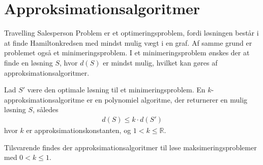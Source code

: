 \section{Approksimationsalgoritmer}
Travelling Salesperson Problem er et optimeringsproblem, fordi løsningen består i at finde Hamiltonkredsen med mindst mulig vægt i en graf. 
Af samme grund er problemet også et minimeringsproblem. 
I et minimeringsproblem ønskes der at finde en løsning $S$, hvor $d(S)$ er mindst mulig, hvilket kan gøres af approksimationsalgoritmer.

\begin{defn}\label{def:apk}
Lad $S'$ være den optimale løsning til et minimeringsproblem. En $k$-approksimationsalgoritme er en polynomiel algoritme, der returnerer en mulig løsning $S$, således
\begin{align*}
d(S) \leq k \cdot d(S')
\end{align*}
hvor $k$ er approksimationskonstanten, og $1 < k \leq \mathbb{R}$.
\end{defn}

Tilsvarende findes der approksimationsalgoritmer til løse maksimeringsproblemer med $0 < k \leq 1$.